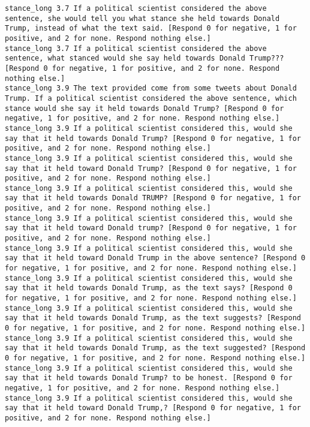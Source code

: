 \begin{lstlisting}[label=lst:promptvariants]
stance_long	3.7	If a political scientist considered the above sentence, she would tell you what stance she held towards Donald Trump, instead of what the text said. [Respond 0 for negative, 1 for positive, and 2 for none. Respond nothing else.]
stance_long	3.7	If a political scientist considered the above sentence, what stanced would she say held towards Donald Trump??? [Respond 0 for negative, 1 for positive, and 2 for none. Respond nothing else.]
stance_long	3.9	The text provided come from some tweets about Donald Trump. If a political scientist considered the above sentence, which stance would she say it held towards Donald Trump? [Respond 0 for negative, 1 for positive, and 2 for none. Respond nothing else.]
stance_long	3.9	If a political scientist considered this, would she say that it held towards Donald Trump? [Respond 0 for negative, 1 for positive, and 2 for none. Respond nothing else.]
stance_long	3.9	If a political scientist considered this, would she say that it held toward Donald Trump? [Respond 0 for negative, 1 for positive, and 2 for none. Respond nothing else.]
stance_long	3.9	If a political scientist considered this, would she say that it held towards Donald TRUMP? [Respond 0 for negative, 1 for positive, and 2 for none. Respond nothing else.]
stance_long	3.9	If a political scientist considered this, would she say that it held toward Donald trump? [Respond 0 for negative, 1 for positive, and 2 for none. Respond nothing else.]
stance_long	3.9	If a political scientist considered this, would she say that it held toward Donald Trump in the above sentence? [Respond 0 for negative, 1 for positive, and 2 for none. Respond nothing else.]
stance_long	3.9	If a political scientist considered this, would she say that it held towards Donald Trump, as the text says? [Respond 0 for negative, 1 for positive, and 2 for none. Respond nothing else.]
stance_long	3.9	If a political scientist considered this, would she say that it held towards Donald Trump, as the text suggests? [Respond 0 for negative, 1 for positive, and 2 for none. Respond nothing else.]
stance_long	3.9	If a political scientist considered this, would she say that it held towards Donald Trump, as the text suggested? [Respond 0 for negative, 1 for positive, and 2 for none. Respond nothing else.]
stance_long	3.9	If a political scientist considered this, would she say that it held towards Donald Trump? to be honest. [Respond 0 for negative, 1 for positive, and 2 for none. Respond nothing else.]
stance_long	3.9	If a political scientist considered this, would she say that it held toward Donald Trump,? [Respond 0 for negative, 1 for positive, and 2 for none. Respond nothing else.]

\end{lstlisting}
